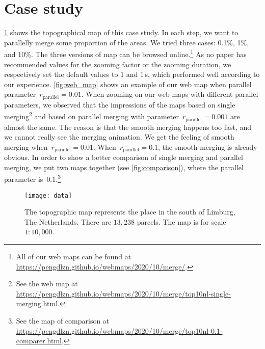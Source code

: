 \documentclass{ica}
\begin{document}
\section{Case study}
\label{sec:case_study}





%
\fig\ref{fig:data} shows the topographical map of this case study.
In each step, we want to parallelly merge some proportion of the areas.
We tried three cases: 0.1\%, 1\%, and 10\%.
The three versions of map can be browsed online.\footnote{%
All of our web maps can be found at
\url{https://pengdlzn.github.io/webmaps/2020/10/merge/}.}
As no paper has recommended values for 
the zooming factor or the zooming duration,
we respectively set the default values to $1$ and $1\,$s, 
which performed well according to our experience.
\fig\ref{fig:web_map} shows an example of our web map when 
parallel parameter~$r_\mathrm{parallel}=0.01$.
When zooming on our web maps with different parallel parameters,
we observed that the impressions of the maps 
based on single merging\footnote{%
See the web map at
\url{https://pengdlzn.github.io/webmaps/2020/10/merge/top10nl-single-merging.html}.} 
and based on parallel merging with parameter~$r_\mathrm{parallel}= 0.001$ 
are almost the same.
The reason is that the smooth merging happens too fast,
and we cannot really see the merging animation.
We get the feeling of smooth merging when~$r_\mathrm{parallel}= 0.01$.
When~$r_\mathrm{parallel}= 0.1$, the smooth merging is already obvious.
In order to show a better comparison of single merging 
and parallel merging,
we put two maps together (see \fig\ref{fig:comparison}),
where the parallel parameter is~$0.1$.\footnote{%
See the map of comparison at
\url{https://pengdlzn.github.io/webmaps/2020/10/merge/top10nl-0.1-comparer.html}.}  




\begin{figure}[tb]
\centering
\texttt{[image: data]}
\caption{
    The topographic map represents the place 
    in the south of Limburg, The Netherlands.
    There are $13{,}238$ parcels.
    The map is for scale $1:10{,}000$.}
\label{fig:data}
\end{figure}
\end{document}
